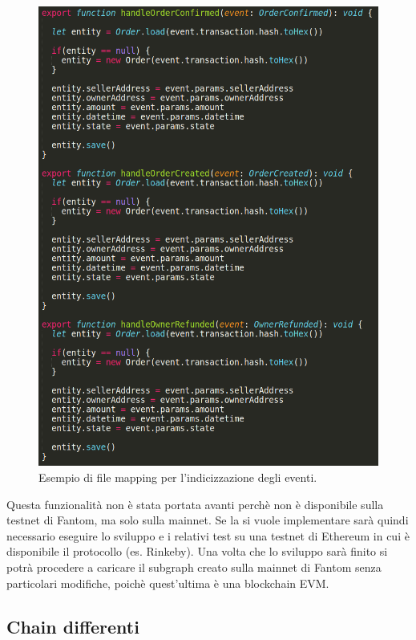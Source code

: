 \begin{itemize}
 \begin{figure}[H]
    \centering
    \includegraphics[scale=0.3]{immagini/map.png}
    \caption{Esempio di file mapping per l'indicizzazione degli eventi.}
 \end{figure}

\end{itemize}

Questa funzionalità non è stata portata avanti perchè non è disponibile sulla testnet di Fantom, ma solo sulla mainnet. Se la si vuole implementare sarà quindi necessario eseguire lo sviluppo e i relativi test su una testnet di Ethereum in cui è disponibile il protocollo (es. Rinkeby\glo). Una volta che lo sviluppo sarà finito si potrà procedere a caricare il subgraph creato sulla mainnet di Fantom senza particolari modifiche, poichè quest'ultima è una blockchain EVM.


\subsection{Chain differenti}

